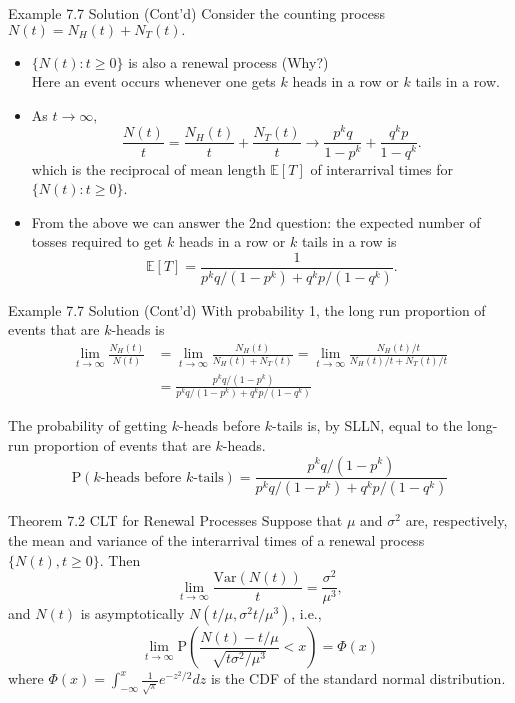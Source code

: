 \documentclass[letterpaper,handout]{beamer}
\def\p{\mathrm P}
\def\E{\mathbb E}
\def\V{\mathrm{Var}}
\begin{document}
\begin{frame}{Example 7.7  Solution (Cont'd)}
Consider the counting process $N(t)=N_H(t)+N_T(t).$
\begin{itemize}
\item $\{N(t): t\ge 0\}$ is also a renewal process (Why?)\\
Here an event occurs whenever one gets $k$ heads in a row  or $k$ tails in a row.
\item As $t\to\infty,$
$$
\frac{N(t)}{t}=\frac{N_H(t)}{t}+\frac{N_T(t)}{t}\to\frac{p^kq}{1-p^k}+\frac{q^kp}{1-q^k}.
$$
which is the reciprocal of mean length $\E[T]$ of interarrival times for $\{N(t): t\ge 0\}$.
\item From the above we can answer the 2nd question:
the expected number of tosses required to get $k$ heads in a row or $k$ tails in a row is
$$\E[T]=\frac{1}{p^kq/(1-p^k)+q^kp/(1-q^k)}.$$
\end{itemize}
\end{frame}
\begin{frame}{Example 7.7  Solution (Cont'd)}
With probability 1, the long run proportion of events that are $k$-heads is
\begin{align*}
\lim_{t\to\infty}\frac{N_H(t)}{N(t)}&=\lim_{t\to\infty}\frac{N_H(t)}{N_H(t)+N_T(t)}
=\lim_{t\to\infty}\frac{N_H(t)/t}{N_H(t)/t+N_T(t)/t}\\
&=\frac{p^kq/(1-p^k)}{p^kq/(1-p^k)+q^kp/(1-q^k)}
\end{align*}

The probability of getting $k$-heads before $k$-tails is,
by SLLN,
equal to the long-run proportion of events that are $k$-heads.
$$\p(\text{$k$-heads before $k$-tails})=\frac{p^kq/(1-p^k)}{p^kq/(1-p^k)+q^kp/(1-q^k)}$$
\end{frame}
\begin{frame}{Theorem 7.2\; CLT for Renewal Processes}
Suppose that $\mu$ and $\sigma^2$ are, respectively, the mean and variance
of the interarrival times of a renewal process $\{N(t),t\ge 0\}$. Then
$$\lim_{t\to\infty}\frac{\V(N(t))}{t}=\frac{\sigma^2}{\mu^3},$$
and $N(t)$ is asymptotically $N(t/\mu, \sigma^2t/\mu^3)$, i.e.,
$$
\lim_{t\to\infty}\p\left(\frac{N(t)-t/\mu}{\sqrt{t\sigma^2/\mu^3}}<x\right)=\Phi(x)
$$
where $\Phi(x)=\int_{-\infty}^x\frac{1}{\sqrt{\pi}}e^{-z^2/2}dz$ is the CDF of the standard normal distribution.
\end{frame}
\end{document}
